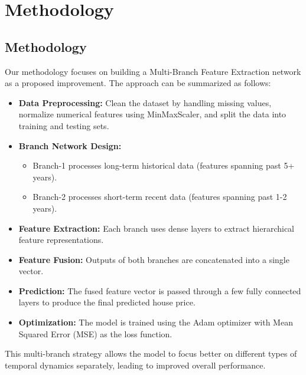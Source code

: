 \chapter{Methodology}

\section{Methodology}

Our methodology focuses on building a Multi-Branch Feature Extraction network as a proposed improvement. The approach can be summarized as follows:

\begin{itemize}
    \item \textbf{Data Preprocessing:} Clean the dataset by handling missing values, normalize numerical features using MinMaxScaler, and split the data into training and testing sets.
    
    \item \textbf{Branch Network Design:} 
    \begin{itemize}
        \item Branch-1 processes long-term historical data (features spanning past 5+ years).
        \item Branch-2 processes short-term recent data (features spanning past 1-2 years).
    \end{itemize}
    
    \item \textbf{Feature Extraction:} Each branch uses dense layers to extract hierarchical feature representations.

    \item \textbf{Feature Fusion:} Outputs of both branches are concatenated into a single vector.

    \item \textbf{Prediction:} The fused feature vector is passed through a few fully connected layers to produce the final predicted house price.
    
    \item \textbf{Optimization:} The model is trained using the Adam optimizer with Mean Squared Error (MSE) as the loss function.
\end{itemize}

This multi-branch strategy allows the model to focus better on different types of temporal dynamics separately, leading to improved overall performance.
